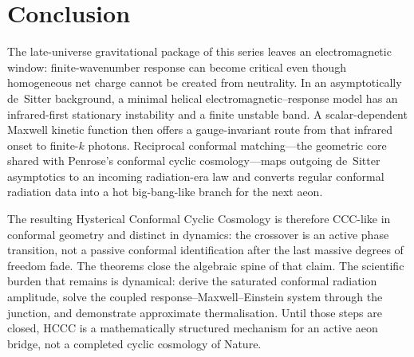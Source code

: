 \documentclass[11pt]{article}
\theoremstyle{definition}
\theoremstyle{remark}
\begin{document}
\section{Conclusion}
\label{sec:conclusion}
The late-universe gravitational package of this series leaves an electromagnetic window:
finite-wavenumber response can become critical even though homogeneous net charge cannot be
created from neutrality.
In an asymptotically de~Sitter background, a minimal helical electromagnetic--response model
has an infrared-first stationary instability and a finite unstable band.
A scalar-dependent Maxwell kinetic function then offers a gauge-invariant route from that
infrared onset to finite-$k$ photons.
Reciprocal conformal matching---the geometric core shared with Penrose's conformal cyclic
cosmology---maps outgoing de~Sitter asymptotics to an incoming radiation-era law and converts
regular conformal radiation data into a hot big-bang-like branch for the next aeon.

The resulting Hysterical Conformal Cyclic Cosmology is therefore CCC-like in conformal
geometry and distinct in dynamics: the crossover is an active phase transition, not a passive
conformal identification after the last massive degrees of freedom fade.
The theorems close the algebraic spine of that claim.
The scientific burden that remains is dynamical: derive the saturated conformal radiation
amplitude, solve the coupled response--Maxwell--Einstein system through the junction, and
demonstrate approximate thermalisation.
Until those steps are closed, HCCC is a mathematically structured mechanism for an active
aeon bridge, not a completed cyclic cosmology of Nature.



\end{document}
